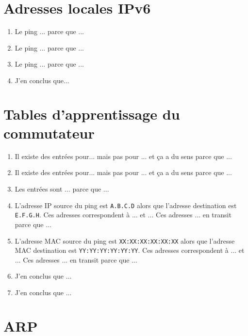 \documentclass[]{article}
\begin{document}
\section*{Adresses locales IPv6}

\begin{enumerate}
    \item Le ping ... parce que ...
    \item Le ping ... parce que ...
    \item Le ping ... parce que ...
    \item J'en conclus que...
\end{enumerate}

\section*{Tables d'apprentissage du commutateur}

\begin{enumerate}
    \item Il existe des entrées pour... mais pas pour ... et ça a du sens parce que ...
    \item Il existe des entrées pour... mais pas pour ... et ça a du sens parce que ...
    \item Les entrées sont ... parce que ...

    \item L'adresse IP source du ping est \texttt{A.B.C.D} alors que l'adresse destination
          est \texttt{E.F.G.H}. Ces adresses correspondent à ... et ... Ces adresses ... en
          transit parce que ...
    \item L'adresse MAC source du ping est \texttt{XX:XX:XX:XX:XX:XX} alors que l'adresse
          MAC destination est \texttt{YY:YY:YY:YY:YY:YY}. Ces adresses correspondent à ... et ...
          Ces adresses ... en transit parce que ...
    \item J'en conclus que ...
    \item J'en conclus que ...
\end{enumerate}

\section*{ARP}
\end{document}
